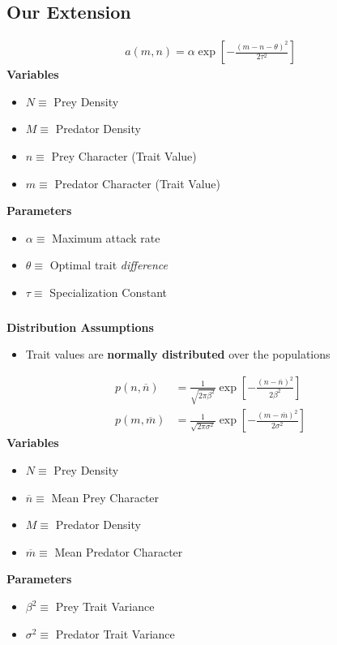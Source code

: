 \documentclass[10pt]{beamer}
\begin{document}
\subsection{Our Extension}
\begin{frame}
	\begin{align*}
		a(m, n) = \alpha \exp\left[-\frac{(m - n - \theta)^2}{2\tau^2}\right]
	\end{align*}
	{\bf Variables}
	\begin{itemize}
		\item $N \equiv $ Prey Density
		\item $M \equiv $ Predator Density
		\item $n \equiv $ Prey Character (Trait Value)
		\item $m \equiv $ Predator Character (Trait Value)
	\end{itemize}
	{\bf Parameters}
	\begin{itemize}
		\item $\alpha \equiv $ Maximum attack rate
		\item $\theta \equiv $ Optimal trait {\it difference}
		\item $\tau \equiv $ Specialization Constant
	\end{itemize}
\end{frame}
\begin{frame}
	\frametitle{}
	{\bf Distribution Assumptions}
	\begin{itemize}
		\item Trait values are {\bf normally distributed} over the populations
	\end{itemize}
	\begin{align*}
		p(n, \overline{n}) &= \frac{1}{\sqrt{2\pi\beta^2}}\exp\left[{-\frac{(n - \overline{n})^2}{2\beta^2}}\right] \\
		p(m, \overline{m}) &= \frac{1}{\sqrt{2\pi\sigma^2}}\exp\left[{-\frac{(m - \overline{m})^2}{2\sigma^2}}\right]
	\end{align*}
	{\bf Variables}
	\begin{itemize}
		\item $N \equiv $ Prey Density
		\item $\overline{n} \equiv $ Mean Prey Character
		\item $M \equiv $ Predator Density
		\item $\overline{m} \equiv $ Mean Predator Character
	\end{itemize}
	{\bf Parameters}
	\begin{itemize}
		\item $\beta^2 \equiv $ Prey Trait Variance
		\item $\sigma^2 \equiv $ Predator Trait Variance
	\end{itemize}
\end{frame}
\end{document}
